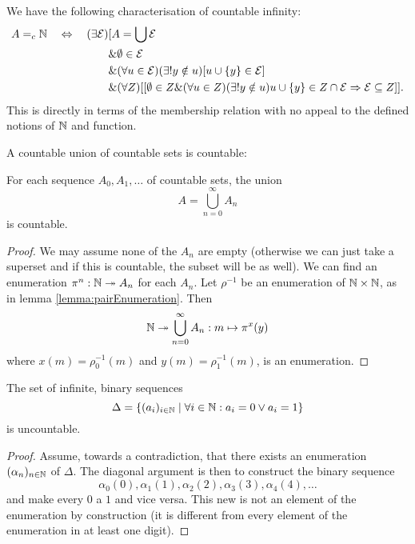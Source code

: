 \begin{lemma}
We have the following characterisation of countable infinity:
\begin{align*}
A =_c \mathbb{N} \quad \Leftrightarrow \quad (\exists \mathcal{E})&[A = \bigcup \mathcal{E} \\
&\& \emptyset \in \mathcal{E} \\
&\& (\forall u\in \mathcal{E})(\exists ! y \notin u)[u\cup \{ y \}\in \mathcal{E}] \\
&\& (\forall Z)[[\emptyset \in Z \& (\forall u \in Z)(\exists ! y \notin u)u\cup \{y\} \in Z \cap \mathcal{E} \Rightarrow \mathcal{E}\subseteq Z]].
\end{align*}
This is directly in terms of the membership relation with no appeal to the defined notions of $\mathbb{N}$ and function.
\end{lemma}

\begin{proposition}[Cantor]
A countable union of countable sets is countable:

For each sequence $A_0, A_1, \ldots$ of countable sets, the union
\[ A = \bigcup_{n=0}^\infty A_n \]
is countable.
\end{proposition}
\begin{proof}
We may assume none of the $A_n$ are empty (otherwise we can just take a superset and if this is countable, the subset will be as well). We can find an enumeration $\pi^n: \mathbb{N}\twoheadrightarrow A_n$ for each $A_n$. Let $\rho^{-1}$ be an enumeration of $\mathbb{N}\times\mathbb{N}$, as in lemma \ref{lemma:pairEnumeration}. Then
\[ \mathbb{N} \twoheadrightarrow  \bigcup_{n=0}^\infty A_n: m\mapsto \pi^{x}(y) \]
where $x(m) = \rho^{-1}_0(m)$ and $y(m) = \rho^{-1}_1(m)$, is an enumeration.
\end{proof}

\begin{proposition}
The set of infinite, binary sequences
\[ \Delta = \{ (a_i)_{i\in\mathbb{N}} \;|\; \forall i\in\mathbb{N}: a_i=0\lor a_i=1 \} \]
is uncountable.
\end{proposition}
\begin{proof}
Assume, towards a contradiction, that there exists an enumeration $(\alpha_n)_{n\in\mathbb{N}}$ of $\Delta$. The diagonal argument is then to construct the binary sequence
\[ \alpha_0(0),\alpha_1(1), \alpha_2(2), \alpha_3(3), \alpha_4(4),\ldots  \]
and make every $0$ a $1$ and vice versa. This new is not an element of the enumeration by construction (it is different from every element of the enumeration in at least one digit).
\end{proof}

